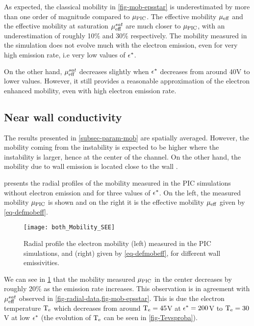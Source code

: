   As expected, the classical mobility in  \cref{fig-mob-epsstar} is underestimated by more than one order of magnitude compared to $\mu_{\mathrm{PIC}}$.
  The effective mobility $\mu_{\mathrm{eff}}$ and the effective mobility at saturation $\mu_{\mathrm{eff}}^{sat}$  are much closer to $\mu_{\mathrm{PIC}}$, with an underestimation of roughly 10\% and 30\% respectively.
  The mobility measured in the simulation does not evolve much with the electron emission, even for very high emission rate, i.e very low values of $\epsilon^{*}$.
  
  On the other hand, $\mu_{\mathrm{eff}}^{sat}$ decreases slightly when $\epsilon^{*}$ decreases from around 40V to lower values.
  However, it still provides a reasonable approximation of the electron enhanced mobility, even with high electron emission rate. 
  
  \subsection{Near wall conductivity}
  
  The results presented in \cref{subsec-param-mob} are spatially averaged.
  However, the mobility coming from the  instability is expected to be higher where the instability is larger, hence at the center of the channel.
  On the other hand, the mobility due to wall emission is located close to the wall \citep{morozov1972}.
  
   presents the radial profiles of the mobility measured in the \ac{PIC}  simulations without electron emission and for three values of $\epsilon^{*}$.
  On the left, the measured mobility $\mu_{\mathrm{PIC}}$ is shown and on the right it is the effective mobility $\mu_{\mathrm{eff}}$ given by \cref{eq-defmobeff}.
  
  \begin{figure}[hbtp]
    \centering
    \texttt{[image: both\_Mobility\_SEE]}
    \caption{Radial profile the electron mobility (left) measured in the \ac{PIC} simulations, and (right) given by \cref{eq-defmobeff}, for different wall emissivities. }
    \label{fig-radial-data}
  \end{figure}
  
  We can see in \cref{fig-radial-data} that the mobility measured $\mu_{\mathrm{PIC}}$  in the center decreases by roughly 20\% as the emission rate increases.
  This observation is in agreement with $\mu_{\mathrm{eff}}^{sat}$ observed in \cref{fig-radial-data,fig-mob-epsstar}.
  This is due the electron temperature $\mathrm{T_e}$ which decreases from around $\mathrm{T_e}=45$V at $\epsilon^{*}=200$V to $\mathrm{T_e}=30$V at low $\epsilon^{*}$ (the evolution of $\mathrm{T_e}$ can be seen in \cref{fig-Tevsproba}).
  
